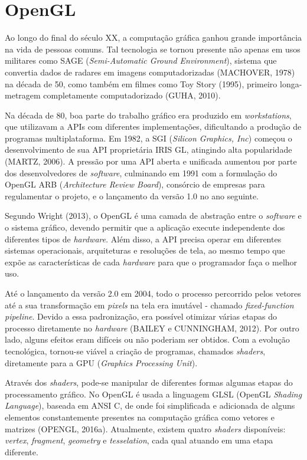 \chapter{OpenGL}
Ao longo do final do século XX, a computação gráfica ganhou grande importância na vida de pessoas comuns. Tal tecnologia se tornou presente não apenas em usos militares como SAGE (\textit{Semi-Automatic Ground Environment}), sistema que convertia dados de radares em imagens computadorizadas (MACHOVER, 1978) na década de 50, como também em filmes como Toy Story (1995), primeiro longa-metragem completamente computadorizado (GUHA, 2010).

Na década de 80, boa parte do trabalho gráfico era produzido em \textit{workstations}, que utilizavam a APIs com diferentes implementações, dificultando a produção de programas multiplataforma. Em 1982, a SGI (\textit{Silicon Graphics, Inc}) começou o desenvolvimento de sua API proprietária IRIS GL, atingindo alta popularidade (MARTZ, 2006). A pressão por uma API aberta e unificada aumentou por parte dos desenvolvedores de \textit{software}, culminando em 1991 com a formulação do OpenGL ARB (\textit{Architecture Review Board}), consórcio de empresas para regulamentar o projeto, e o lançamento da versão 1.0 no ano seguinte.

Segundo Wright (2013), o OpenGL é uma camada de abstração entre o \textit{software} e o sistema gráfico, devendo permitir que a aplicação execute independente dos diferentes tipos de \textit{hardware}. Além disso, a API precisa operar em diferentes sistemas operacionais, arquiteturas e resoluções de tela, ao mesmo tempo que expõe as características de cada \textit{hardware} para que o programador faça o melhor uso.

Até o lançamento da versão 2.0 em 2004, todo o processo percorrido pelos vetores até a sua transformação em \textit{pixels} na tela era imutável - chamado \textit{fixed-function pipeline}. Devido a essa padronização, era possível otimizar várias etapas do processo diretamente no \textit{hardware} (BAILEY e CUNNINGHAM, 2012). Por outro lado, alguns efeitos eram difíceis ou não poderiam ser obtidos. Com a evolução tecnológica, tornou-se viável a criação de programas, chamados \textit{shaders}, diretamente para a GPU (\textit{Graphics Processing Unit}).

Através dos \textit{shaders}, pode-se manipular de diferentes formas algumas etapas do processamento gráfico. No OpenGL é usada a linguagem GLSL (OpenGL \textit{Shading Language}), baseada em ANSI C, de onde foi simplificada e adicionada de alguns elementos constantemente presentes na computação gráfica como vetores e matrizes (OPENGL, 2016a). Atualmente, existem quatro \textit{shaders} disponíveis: \textit{vertex}, \textit{fragment}, \textit{geometry} e \textit{tesselation}, cada qual atuando em uma etapa diferente.

